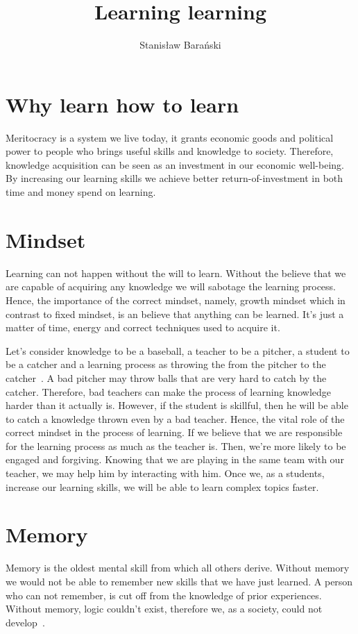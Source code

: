 \documentclass{article}
\title{Learning learning}
\author{Stanisław Barański}
\begin{document}
\maketitle

\section{Why learn how to learn}
Meritocracy is a system we live today, it grants economic goods and political power to people who brings useful skills and knowledge to society. Therefore, knowledge acquisition can be seen as an investment in our economic well-being. By increasing our learning skills we achieve better return-of-investment in both time and money spend on learning. 

\section{Mindset}
Learning can not happen without the will to learn. Without the believe that we are capable of acquiring any knowledge we will sabotage the learning process. Hence, the importance of the correct mindset, namely, growth mindset which in contrast to fixed mindset, is an believe that anything can be learned. It's just a matter of time, energy and correct techniques used to acquire it. 

Let's consider knowledge to be a baseball, a teacher to be a pitcher, a student to be a catcher and a learning process as throwing the from the pitcher to the catcher~\cite{adler2014read}. A bad pitcher may throw balls that are very hard to catch by the catcher. Therefore, bad teachers can make the process of learning knowledge harder than it actually is. However, if the student is skillful, then he will be able to catch a knowledge thrown even by a bad teacher. Hence, the vital role of the correct mindset in the process of learning. If we believe that we are responsible for the learning process as much as the teacher is. Then, we're more likely to be engaged and forgiving. Knowing that we are playing in the same team with our teacher, we may help him by interacting with him. Once we, as a students, increase our learning skills, we will be able to learn complex topics faster.


\section{Memory}
Memory is the oldest mental skill from which all others derive. Without memory we would not be able to remember new skills that we have just learned. A person who can not remember, is cut off from the knowledge of prior experiences. Without memory, logic couldn't exist, therefore we, as a society, could not develop~\cite{csikszentmihalyi1990flow}.
\end{document}
